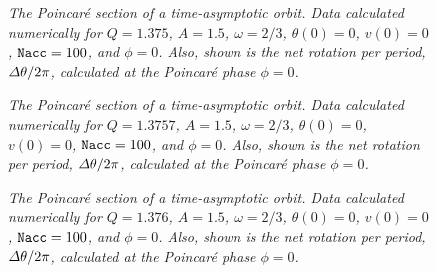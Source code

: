 \begin{figure}
\epsfysize=2.25in
\centerline{}
\caption{\em The Poincar\'{e} section of a time-asymptotic orbit.
Data calculated numerically  for $Q=1.375$, $A=1.5$, $\omega=2/3$,
$\theta(0)=0$, $v(0)=0$,
 ${\tt Nacc} =100$, and $\phi=0$. Also, shown is the
net rotation per period, ${\mit\Delta}\theta/2\pi$, calculated at the Poincar\'{e} phase
$\phi=0$.}\label{f37}
\end{figure}

\begin{figure}
\epsfysize=2.25in
\centerline{}
\caption{\em The Poincar\'{e} section of a time-asymptotic orbit. Data
calculated numerically for $Q=1.3757$, $A=1.5$, $\omega=2/3$,
$\theta(0)=0$, $v(0)=0$,
 ${\tt Nacc} =100$, and $\phi=0$. Also, shown is the
net rotation per period, ${\mit\Delta}\theta/2\pi$, calculated at the Poincar\'{e} phase
$\phi=0$.}\label{f38}
\end{figure}

\begin{figure}
\epsfysize=2.25in
\centerline{}
\caption{\em The Poincar\'{e} section of a time-asymptotic orbit. Data
calculated numerically for $Q=1.376$, $A=1.5$, $\omega=2/3$,
$\theta(0)=0$, $v(0)=0$,
 ${\tt Nacc} =100$, and $\phi=0$. Also, shown is the
net rotation per period, ${\mit\Delta}\theta/2\pi$, calculated at the Poincar\'{e} phase
$\phi=0$.}\label{f39}
\end{figure}

